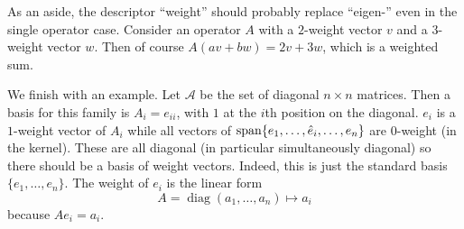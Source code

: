 As an aside, the descriptor ``weight'' should probably replace ``eigen-'' even in the single operator case.
Consider an operator $A$ with a $2$-weight vector $v$ and a $3$-weight vector $w$.
Then of course $A(av+bw) = 2v + 3w$, which is a weighted sum.

We finish with an example.
Let $\mathcal{A}$ be the set of diagonal $n\times n$ matrices.
Then a basis for this family is $A_i = e_{ii}$, with $1$ at the $i$th position on the diagonal.
$e_i$ is a $1$-weight vector of $A_i$ while all vectors of $\operatorname{span}\{e_1,\dots,\hat{e}_i,\dots,e_n\}$ are $0$-weight (in the kernel).
These are all diagonal (in particular simultaneously diagonal) so there should be a basis of weight vectors.
Indeed, this is just the standard basis $\{e_1,\dots,e_n\}$.
The weight of $e_i$ is the linear form
\[
A = \operatorname{diag}(a_1,\dots,a_n) \mapsto a_i
\]
because $A e_i = a_i$.

